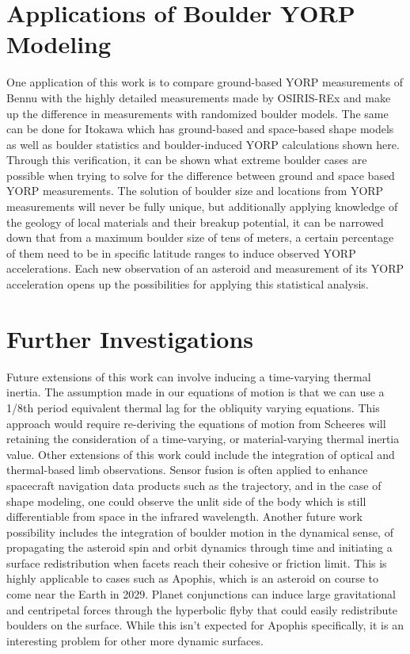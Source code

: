 \section{Applications of Boulder YORP Modeling}
One application of this work is to compare ground-based YORP measurements of Bennu with the highly detailed measurements made by OSIRIS-REx and make up the difference in measurements with randomized boulder models. The same can be done for Itokawa which has ground-based and space-based shape models as well as boulder statistics and boulder-induced YORP calculations shown here. Through this verification, it can be shown what extreme boulder cases are possible when trying to solve for the difference between ground and space based YORP measurements. The solution of boulder size and locations from YORP measurements will never be fully unique, but additionally applying knowledge of the geology of local materials and their breakup potential, it can be narrowed down that from a maximum boulder size of tens of meters, a certain percentage of them need to be in specific latitude ranges to induce observed YORP accelerations. Each new observation of an asteroid and measurement of its YORP acceleration opens up the possibilities for applying this statistical analysis.

\section{Further Investigations}
Future extensions of this work can involve inducing a time-varying thermal inertia. The assumption made in our equations of motion is that we can use a 1/8th period equivalent thermal lag for the obliquity varying equations. This approach would require re-deriving the equations of motion from Scheeres will retaining the consideration of a time-varying, or material-varying thermal inertia value.
Other extensions of this work could include the integration of optical and thermal-based limb observations. Sensor fusion is often applied to enhance spacecraft navigation data products such as the trajectory, and in the case of shape modeling, one could observe the unlit side of the body which is still differentiable from space in the infrared wavelength.
Another future work possibility includes the integration of boulder motion in the dynamical sense, of propagating the asteroid spin and orbit dynamics through time and initiating a surface redistribution when facets reach their cohesive or friction limit. This is highly applicable to cases such as Apophis, which is an asteroid on course to come near the Earth in 2029. Planet conjunctions can induce large gravitational and centripetal forces through the hyperbolic flyby that could easily redistribute boulders on the surface. While this isn't expected for Apophis specifically, it is an interesting problem for other more dynamic surfaces.
